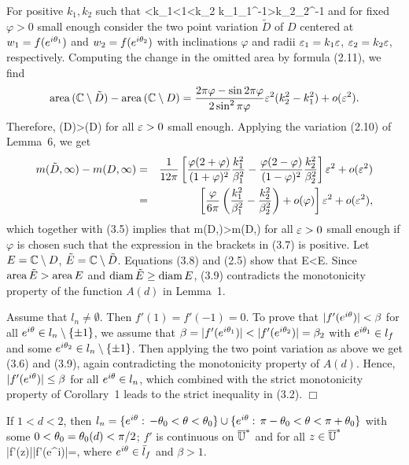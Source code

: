 For positive $k_1,k_2$ such that
<k_1<1<k_2  \quad k_1\beta_1^{-1}>k_2\beta_2^{-1}
\ee
and for fixed $\varphi>0$ small enough consider the two point variation $\tilde D$ of $D$ centered at $w_1=f(e^{i\theta_1})$ and
$w_2=f(e^{i\theta_2})$ with inclinations $\varphi$ and radii $\varepsilon_1=k_1\varepsilon$, $\varepsilon_2=k_2\varepsilon$, respectively. Computing 
the change in the omitted area by formula (2.11), we find
$$
{\rm area}\, ({\Bbb {C}}\setminus \tilde D)-{\rm area}\,({\Bbb {C}}\setminus D)= \frac{2\pi\varphi-\sin 2\pi\varphi}{2\sin^2\pi\varphi}\varepsilon^2(k_2^2-k_1^2)+o(\varepsilon^2).
$$
Therefore,
\be
\area(\C\setminus\tilde D)>\area(\C\setminus D)
\ee
for all $\varepsilon>0$ small enough. Applying the variation (2.10) of Lemma~6, we get
\begin{eqnarray}
m(\tilde D,\infty)-m(D,\infty)&=&
\frac{1}{12\pi}\left[\frac{\varphi(2+\varphi)}{(1+\varphi)^2}\frac{k_1^2}{\beta_1^2}-\frac{\varphi(2-\varphi)}{(1-\varphi)^2}\frac{k_2^2}{\beta_2^2}\right]\varepsilon^2
+o(\varepsilon^2) \nonumber \\
&=& \left[\frac{\varphi}{6\pi}\left ( \frac{k_1^2}{\beta_1^2}-\frac{k_2^2}{\beta_2^2}\right ) +o(\varphi)\right ]\varepsilon^2+o(\varepsilon^2), 
\end{eqnarray}
which together with (3.5) implies that
\be
m(\tilde D,\infty)>m(D,\infty)
\ee
for all $\varepsilon>0$ small enough if $\varphi$ is chosen such that the expression in the brackets in (3.7) is positive. Let 
$E={\Bbb {C}}\setminus D$, $\tilde E={\Bbb {C}}\setminus \tilde D$. Equations (3.8) and (2.5) show that
\be
\CAP \tilde E<\CAP E.
\ee
Since ${\rm area}\, \tilde E>{\rm area}\, E$ and ${\rm diam}\, \tilde E\ge {\rm diam}\, E$, (3.9) contradicts the monotonicity property of the function
$A(d)$ in Lemma~1.

\smallskip

Assume that $l_n\not=\emptyset$. Then $f'(1)=f'(-1)=0$. To prove that $|f'(e^{i\theta})|<\beta$ for all $e^{i\theta}\in l_n\setminus \{\pm 1\}$,
we assume that $\beta=|f'(e^{i\th_1})|<|f'(e^{i\th_2})|=\beta_2$ with $e^{i\theta_1}\in l_f$ and some $e^{i\theta_2}\in l_n\setminus \{\pm 1\}$.
Then applying the two point variation as above we get (3.6) and (3.9), again contradicting the monotonicity property of $A(d)$.
Hence, $|f'(e^{i\theta})|\le \beta$ for all $e^{i\theta}\in l_n$, which combined with the strict monotonicity property of Corollary~1
leads to the strict inequality in (3.2).
$\Box$

\bl
If $1<d<2$, then $l_n=\{e^{i\theta}:\,-\theta_0<\theta<\theta_0\}\cup \{e^{i\theta}:\, \pi-\theta_0<\theta<\pi+\theta_0\}$ with some $0<\theta_0=\theta_0(d)<\pi/2$; $f'$ is continuous
on $\overline{{\Bbb{U}}}^*$ and for all $z\in \overline{{\Bbb{U}}}^*$
\be
|f'(z)|\le |f'(e^{i\th})|=\beta,
\ee
where $e^{i\theta}\in \bar l_f$ and $\beta>1.$
\el

